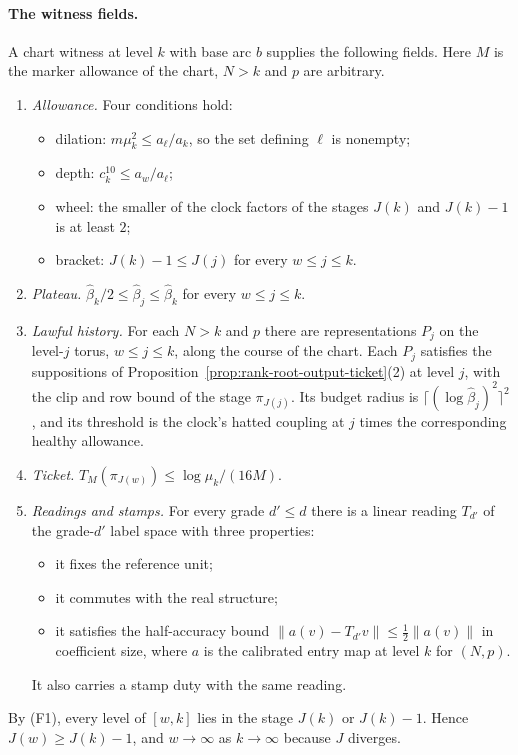 \paragraph{The witness fields.}
A chart witness at level $k$ with base arc $b$ supplies the following
fields. Here $M$ is the marker allowance of the chart, $N>k$ and $p$ are
arbitrary.
\begin{enumerate}
\item[(F1)] \emph{Allowance.} Four conditions hold:
 \begin{itemize}
 \item dilation: $m\mu_k^2\le a_\ell/a_k$, so the set defining $\ell$
  is nonempty;
 \item depth: $c_k^{10}\le a_w/a_\ell$;
 \item wheel: the smaller of the clock factors of the stages $J(k)$ and
  $J(k)-1$ is at least $2$;
 \item bracket: $J(k)-1\le J(j)$ for every $w\le j\le k$.
 \end{itemize}
\item[(F2)] \emph{Plateau.} $\widehat\beta_k/2\le\widehat\beta_j\le\widehat\beta_k$
 for every $w\le j\le k$.
\item[(F3)] \emph{Lawful history.} For each $N>k$ and $p$ there are
 representations $P_j$ on the level-$j$ torus, $w\le j\le k$, along the
 course of the chart. Each $P_j$ satisfies the suppositions of
 Proposition~\ref{prop:rank-root-output-ticket}(2) at level $j$, with the
 clip and row bound of the stage $\pi_{J(j)}$. Its budget radius is
 $\lceil(\log\widehat\beta_j)^2\rceil^2$, and its threshold is the clock's
 hatted coupling at $j$ times the corresponding healthy allowance.
\item[(F4)] \emph{Ticket.} $T_M(\pi_{J(w)})\le\log\mu_k/(16M)$.
\item[(F5)] \emph{Readings and stamps.} For every grade $d'\le d$ there is
 a linear reading $T_{d'}$ of the grade-$d'$ label space with three
 properties:
 \begin{itemize}
 \item it fixes the reference unit;
 \item it commutes with the real structure;
 \item it satisfies the half-accuracy bound
  $\|a(v)-T_{d'}v\|\le\frac12\|a(v)\|$ in coefficient size, where $a$
  is the calibrated entry map at level $k$ for $(N,p)$.
 \end{itemize}
 It also carries a stamp duty with the same reading.
\end{enumerate}
By (F1), every level of $[w,k]$ lies in the stage $J(k)$ or $J(k)-1$. Hence
$J(w)\ge J(k)-1$, and $w\to\infty$ as $k\to\infty$ because $J$ diverges.

